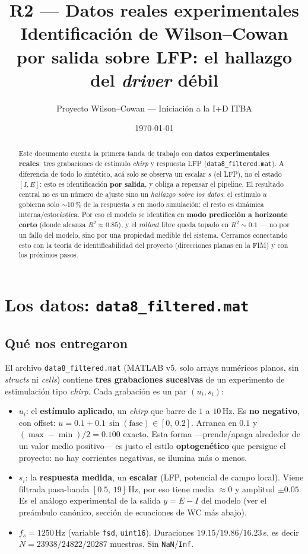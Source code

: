 \documentclass[11pt,a4paper]{article}
\title{\textbf{R2 --- Datos reales experimentales}\\[2pt]\large Identificación de Wilson--Cowan por salida sobre LFP: el hallazgo del \emph{driver} débil}
\author{Proyecto Wilson--Cowan --- Iniciación a la I+D ITBA}
\date{\today}
\begin{document}
\maketitle
\tableofcontents
\bigskip

\begin{abstract}
\noindent Este documento cuenta la primera tanda de trabajo con \textbf{datos experimentales reales}: tres grabaciones de estímulo \emph{chirp} y respuesta LFP (\texttt{data8\_filtered.mat}). A diferencia de todo lo sintético, acá solo se observa un escalar $s$ (el LFP), no el estado $[I,E]$: esto es identificación \textbf{por salida}, y obliga a repensar el pipeline. El resultado central no es un número de ajuste sino un \emph{hallazgo sobre los datos}: el estímulo $u$ gobierna solo $\sim$10\,\% de la respuesta $s$ en modo simulación; el resto es dinámica interna/estocástica. Por eso el modelo se identifica en \textbf{modo predicción a horizonte corto} (donde alcanza $R^2\approx0.85$), y el \emph{rollout} libre queda topado en $R^2\sim0.1$ --- no por un fallo del modelo, sino por una propiedad medible del sistema. Cerramos conectando esto con la teoría de identificabilidad del proyecto (direcciones planas en la FIM) y con los próximos pasos.
\end{abstract}

\section{Los datos: \texttt{data8\_filtered.mat}}

\subsection*{Qué nos entregaron}
El archivo \texttt{data8\_filtered.mat} (MATLAB v5, solo arrays numéricos planos, sin \emph{structs} ni \emph{cells}) contiene \textbf{tres grabaciones sucesivas} de un experimento de estimulación tipo \emph{chirp}. Cada grabación es un par $(u_i, s_i)$:

\begin{itemize}[leftmargin=1.4em]
  \item $u_i$: el \textbf{estímulo aplicado}, un \emph{chirp} que barre de $1$ a $10$\,Hz. Es \textbf{no negativo}, con offset: $u = 0.1 + 0.1\,\sin(\text{fase}) \in [0,\,0.2]$. Arranca en $0.1$ y $(\max-\min)/2 = 0.100$ exacto. Esta forma ---prende/apaga alrededor de un valor medio positivo--- es justo el estilo \textbf{optogenético} que persigue el proyecto: no hay corrientes negativas, se ilumina más o menos.
  \item $s_i$: la \textbf{respuesta medida}, un \textbf{escalar} (LFP, potencial de campo local). Viene filtrada pasa-banda $[0.5,\,19]$\,Hz, por eso tiene media $\approx 0$ y amplitud $\pm 0.05$. Es el análogo experimental de la salida $y = E - I$ del modelo (ver el preámbulo canónico, sección de ecuaciones de WC más abajo).
  \item $f_s = 1250$\,Hz (variable \texttt{fsd}, \texttt{uint16}). Duraciones $19.15 / 19.86 / 16.23$\,s, es decir $N = 23938 / 24822 / 20287$ muestras. Sin \texttt{NaN}/\texttt{Inf}.
\end{itemize}
\end{document}
